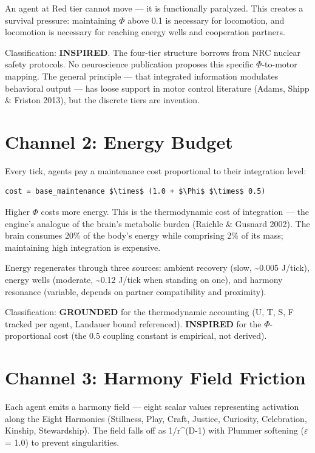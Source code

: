 An agent at Red tier cannot move --- it is functionally paralyzed. This creates a survival pressure: maintaining $\Phi$ above 0.1 is necessary for locomotion, and locomotion is necessary for reaching energy wells and cooperation partners.

Classification: \textbf{INSPIRED}. The four-tier structure borrows from NRC nuclear safety protocols. No neuroscience publication proposes this specific $\Phi$-to-motor mapping. The general principle --- that integrated information modulates behavioral output --- has loose support in motor control literature (Adams, Shipp \& Friston 2013), but the discrete tiers are invention.

\section{Channel 2: Energy Budget}\label{channel-2-energy-budget}

Every tick, agents pay a maintenance cost proportional to their integration level:

\begin{verbatim}
cost = base_maintenance $\times$ (1.0 + $\Phi$ $\times$ 0.5)
\end{verbatim}

Higher $\Phi$ costs more energy. This is the thermodynamic cost of integration --- the engine's analogue of the brain's metabolic burden (Raichle \& Gusnard 2002). The brain consumes 20\% of the body's energy while comprising 2\% of its mass; maintaining high integration is expensive.

Energy regenerates through three sources: ambient recovery (slow, \textasciitilde0.005 J/tick), energy wells (moderate, \textasciitilde0.12 J/tick when standing on one), and harmony resonance (variable, depends on partner compatibility and proximity).

Classification: \textbf{GROUNDED} for the thermodynamic accounting (U, T, S, F tracked per agent, Landauer bound referenced). \textbf{INSPIRED} for the $\Phi$-proportional cost (the 0.5 coupling constant is empirical, not derived).

\section{Channel 3: Harmony Field Friction}\label{channel-3-harmony-field-friction}

Each agent emits a harmony field --- eight scalar values representing activation along the Eight Harmonies (Stillness, Play, Craft, Justice, Curiosity, Celebration, Kinship, Stewardship). The field falls off as 1/r\^{}(D-1) with Plummer softening ($\varepsilon$ = 1.0) to prevent singularities.


